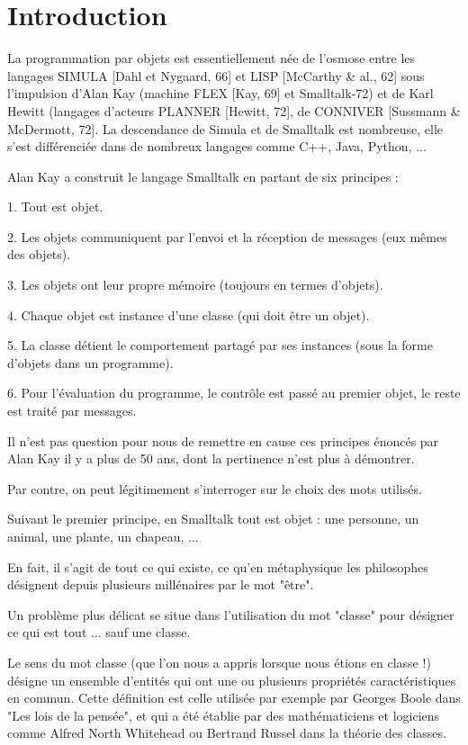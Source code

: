 \documentclass[a4paper, 12pt, openright, french]{book}
\begin{document}
\tableofcontents

\cleardoublepage
\chapter{Introduction}

La programmation par objets est essentiellement née de
l'osmose entre les langages SIMULA {[}Dahl et Nygaard,
66{]} et LISP {[}McCarthy \& al., 62{]} sous l'impulsion
d'Alan Kay (machine FLEX {[}Kay, 69{]} et Smalltalk-72)
et de Karl Hewitt (langages d'acteurs PLANNER {[}Hewitt,
72{]}, de CONNIVER {[}Sussmann \& McDermott, 72{]}. La descendance de
Simula et de Smalltalk est nombreuse, elle s'est
différenciée dans de nombreux langages comme C++, Java, Python,
...

Alan Kay a construit le langage Smalltalk en partant de six principes :

1. Tout est objet.

2. Les objets communiquent par l'envoi et la réception de messages (eux
mêmes des objets).

3. Les objets ont leur propre mémoire (toujours en termes d'objets).

4. Chaque objet est instance d'une classe (qui doit être un objet).

5. La classe détient le comportement partagé par ses instances (sous la
forme d'objets dans un programme).

6. Pour l'évaluation du programme, le contrôle est passé au premier
objet, le reste est traité par messages.

Il n'est pas question pour nous de remettre en cause ces
principes énoncés par Alan Kay il y a plus de 50 ans, dont la pertinence
n'est plus à démontrer. 

Par contre, on peut légitimement
s'interroger sur le choix des mots utilisés.

Suivant le premier principe, en Smalltalk tout est objet : une personne,
un animal, une plante, un chapeau, ...

En fait, il s'agit de tout ce qui existe, ce
qu'en métaphysique les philosophes désignent depuis
plusieurs millénaires par le mot "être".

Un problème plus délicat se situe dans l'utilisation du
mot "classe" pour désigner ce qui est tout ... sauf une classe.

Le sens du mot classe (que l'on nous a appris lorsque
nous étions en classe !) désigne un ensemble d'entités
qui ont une ou plusieurs propriétés caractéristiques en commun. Cette
définition est celle utilisée par exemple par Georges Boole dans "Les
lois de la pensée", et qui a été établie par des
mathématiciens et logiciens comme Alfred North Whitehead ou Bertrand
Russel dans la théorie des classes.
\end{document}
